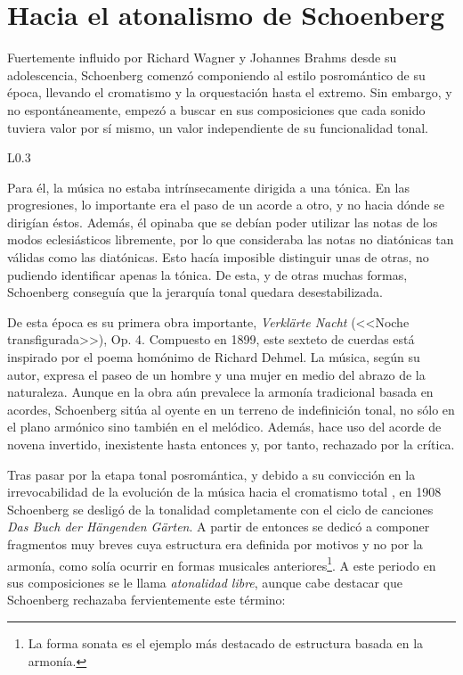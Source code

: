 	\section{Hacia el atonalismo de Schoenberg}
		Fuertemente influido por Richard Wagner y Johannes Brahms desde su adolescencia, Schoenberg comenzó componiendo al estilo posromántico de su época, llevando el cromatismo y la orquestación hasta el extremo. Sin embargo, y no espontáneamente, empezó a buscar en sus composiciones que cada sonido tuviera valor por sí mismo, un valor independiente de su funcionalidad tonal. 
		
		\begin{wrapfigure}{L}{0.3\textwidth}
			\captionsetup{justification=centering, font=footnotesize}
			\vspace{-0.5cm}
		\end{wrapfigure}
		Para él, la música no estaba intrínsecamente dirigida a una tónica. En las progresiones, lo importante era el paso de un acorde a otro, y no hacia dónde se dirigían éstos. Además, él opinaba que se debían poder utilizar las notas de los modos eclesiásticos libremente, por lo que consideraba las notas no diatónicas tan válidas como las diatónicas. Esto hacía imposible distinguir unas de otras, no pudiendo identificar apenas la tónica. De esta, y de otras muchas formas, Schoenberg conseguía que la jerarquía tonal quedara desestabilizada. \cite{kinney}
		
		De esta época es su primera obra importante, \emph{Verklärte Nacht} (<<Noche transfigurada>>), Op. 4. Compuesto en 1899, este sexteto de cuerdas está inspirado por el poema homónimo de Richard Dehmel. La música, según su autor, expresa el paseo de un hombre y una mujer en medio del abrazo de la naturaleza.  Aunque en la obra aún prevalece la armonía tradicional basada en acordes, Schoenberg sitúa al oyente en un terreno de indefinición tonal, no sólo en el plano armónico sino también en el melódico. Además, hace uso del acorde de novena invertido, inexistente hasta entonces y, por tanto, rechazado por la crítica. \cite{diaz}
				
		Tras pasar por la etapa tonal posromántica, y debido a su convicción en la irrevocabilidad de la evolución de la música hacia el cromatismo total \cite{delgado}, en 1908 Schoenberg se desligó de la tonalidad completamente con el ciclo de canciones \emph{Das Buch der Hängenden Gärten}. A partir de entonces se dedicó a componer fragmentos muy breves cuya estructura era definida por motivos y no por la armonía, como solía ocurrir en formas musicales anteriores\footnote{La forma sonata es el ejemplo más destacado de estructura basada en la armonía.}. A este periodo en sus composiciones se le llama \emph{atonalidad libre}, aunque cabe destacar que Schoenberg rechazaba fervientemente este término:
		
